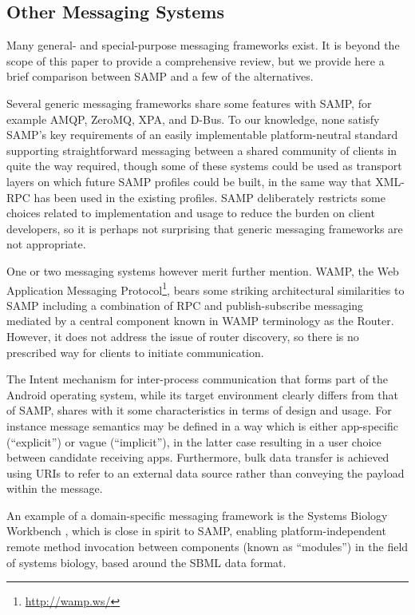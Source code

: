 \documentclass[5p]{elsarticle}
\begin{document}
\subsection{Other Messaging Systems}

Many general- and special-purpose messaging frameworks exist.
It is beyond the scope of this paper to provide a comprehensive
review, but we provide here a brief comparison between SAMP and
a few of the alternatives.

Several generic messaging frameworks share some features with SAMP, 
for example AMQP, ZeroMQ, XPA, and D-Bus.
To our knowledge, none
satisfy SAMP's key requirements of an easily implementable
platform-neutral standard supporting straightforward messaging
between a shared community of clients in quite the way required,
though some of these systems could be used as transport layers on
which future SAMP profiles could be built, in the same way
that XML-RPC has been used in the existing profiles.
SAMP deliberately restricts some choices related to implementation
and usage to reduce the burden on client developers,
so it is perhaps not surprising that generic messaging
frameworks are not appropriate.

One or two messaging systems however merit further mention.
WAMP, the Web Application Messaging Protocol\footnote{\url{http://wamp.ws/}}, 
bears some striking architectural similarities to SAMP including 
a combination of RPC and publish-subscribe messaging mediated by 
a central component known in WAMP terminology as the Router.
However, it does not address the issue of router discovery,
so there is no prescribed way for clients to initiate communication.

The Intent mechanism for inter-process communication that forms part of
the Android operating system, while its target environment
clearly differs from that of SAMP,
shares with it some characteristics in terms of design and usage.
For instance message semantics may be defined in a way which
is either app-specific (``explicit'') or vague (``implicit''),
in the latter case resulting in a
user choice between candidate receiving apps.
Furthermore, bulk data transfer is achieved
using URIs to refer to an external data source
rather than conveying the payload within the message.

An example of a domain-specific messaging framework is
the Systems Biology Workbench \citep{sbw},
which is close in spirit to SAMP, enabling platform-independent 
remote method invocation between components (known as ``modules'') 
in the field of systems biology, based around the SBML data format.
\end{document}
